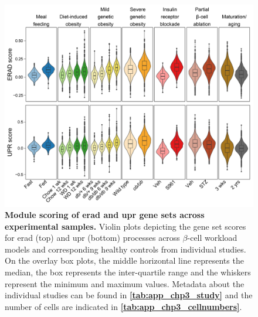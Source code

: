 \begin{figure}[H]
\centering
\includegraphics[width=12cm,keepaspectratio]{Appendix2/Fig/F3-22-02.png}
\caption[Module scoring of  and  gene sets across experimental samples]{\textbf{Module scoring of \gls{erad} and \gls{upr} gene sets across experimental samples.} Violin plots depicting the gene set scores for \gls{erad} (top) and \gls{upr} (bottom) processes across $\beta$-cell workload models and corresponding healthy controls from individual studies. On the overlay box plots, the middle horizontal line represents the median, the box represents the inter-quartile range and the whiskers represent the minimum and maximum values. Metadata about the individual studies can be found in \textbf{\autoref{tab:app_chp3_study}} and the number of cells are indicated in \textbf{\autoref{tab:app_chp3_cellnumbers}}.}
\vspace{-25pt}
\label{fig:app_chp3_eradupr}
\end{figure}


